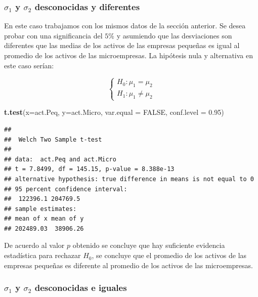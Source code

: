 \documentclass[letterpaper,]{book}
\newenvironment{Shaded}{\begin{snugshade}}{\end{snugshade}}
\newcommand{\DataTypeTok}[1]{\textcolor[rgb]{0.13,0.29,0.53}{#1}}
\newcommand{\FloatTok}[1]{\textcolor[rgb]{0.00,0.00,0.81}{#1}}
\newcommand{\KeywordTok}[1]{\textcolor[rgb]{0.13,0.29,0.53}{\textbf{#1}}}
\newcommand{\NormalTok}[1]{#1}
\newcommand{\OtherTok}[1]{\textcolor[rgb]{0.56,0.35,0.01}{#1}}
\begin{document}
\hypertarget{sigma_1-y-sigma_2-desconocidas-y-diferentes}{%
\subsubsection{\texorpdfstring{\(\sigma_1\) y \(\sigma_2\) desconocidas y diferentes}{\textbackslash{}sigma\_1 y \textbackslash{}sigma\_2 desconocidas y diferentes}}\label{sigma_1-y-sigma_2-desconocidas-y-diferentes}}

En este caso trabajamos con los mismos datos de la sección anterior. Se desea probar con una significancia del \(5\%\) y asumiendo que las desviaciones son diferentes que las medias de los activos de las empresas pequeñas es igual al promedio de los activos de las microempresas. La hipótesis nula y alternativa en este caso serían:

\begin{equation} 
\begin{cases} 
H_0: \mu_1 = \mu_2 \\ 
H_1: \mu_1 \neq \mu_2
\end{cases} 
\end{equation}

\begin{Shaded}
\begin{Highlighting}[]
\KeywordTok{t.test}\NormalTok{(}\DataTypeTok{x=}\NormalTok{act.Peq, }\DataTypeTok{y=}\NormalTok{act.Micro, }\DataTypeTok{var.equal =} \OtherTok{FALSE}\NormalTok{,}
       \DataTypeTok{conf.level =} \FloatTok{0.95}\NormalTok{)}
\end{Highlighting}
\end{Shaded}

\begin{verbatim}
## 
##  Welch Two Sample t-test
## 
## data:  act.Peq and act.Micro
## t = 7.8499, df = 145.15, p-value = 8.388e-13
## alternative hypothesis: true difference in means is not equal to 0
## 95 percent confidence interval:
##  122396.1 204769.5
## sample estimates:
## mean of x mean of y 
## 202489.03  38906.26
\end{verbatim}

De acuerdo al valor \(p\) obtenido se concluye que hay suficiente evidencia estadística para rechazar \(H_0\), se concluye que el promedio de los activos de las empresas pequeñas es diferente al promedio de los activos de las microempresas.

\hypertarget{sigma_1-y-sigma_2-desconocidas-e-iguales}{%
\subsubsection{\texorpdfstring{\(\sigma_1\) y \(\sigma_2\) desconocidas e iguales}{\textbackslash{}sigma\_1 y \textbackslash{}sigma\_2 desconocidas e iguales}}\label{sigma_1-y-sigma_2-desconocidas-e-iguales}}
\end{document}
